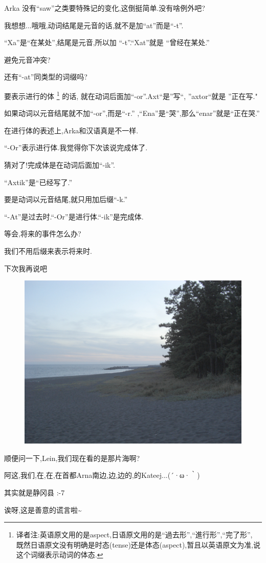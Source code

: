 Arka 没有``saw''之类要特殊记的变化,这倒挺简单.没有啥例外吧?


我想想...哦哦,动词结尾是元音的话,就不是加``at''而是``-t''.

``Xa''是``在某处'',结尾是元音,所以加 ``-t''.``Xat''就是 ``曾经在某处.''


避免元音冲突?

还有``-at''同类型的词缀吗?


要表示进行的体
\footnote{译者注:英语原文用的是aspect,日语原文用的是``過去形'',``進行形'',``完了形'',
既然日语原文没有明确是时态(tense)还是体态(aspect),暂且以英语原文为准,说这个词缀表示动词的体态.}
的话,
就在动词后面加``-or''.Axt``是''写``, ''axtor``就是 ''正在写."

如果动词以元音结尾就不加``-or'',而是``-r.'' ,``Ena''是``哭'',那么``enar''就是``正在哭.''


在进行体的表述上,Arka和汉语真是不一样.

``-Or''表示进行体.我觉得你下次该说完成体了.


猜对了!完成体是在动词后面加``-ik''.

``Axtik''是``已经写了.''

要是动词以元音结尾,就只用加后缀``-k.''


``-At''是过去时.``-Or''是进行体.``-ik''是完成体.

等会,将来的事件怎么办?


我们不用后缀来表示将来时.

下次我再说吧

\begin{figure}[H]
\includegraphics[width=1\textwidth]{ARKA/tier.jpg}
\end{figure}

顺便问一下,Lein,我们现在看的是那片海啊?


阿这,我们,在,在,在首都Arna南边,边,边的,的Kateej...(´·ω·｀)


其实就是静冈县 :-7


诶呀,这是善意的谎言啦\~{}




